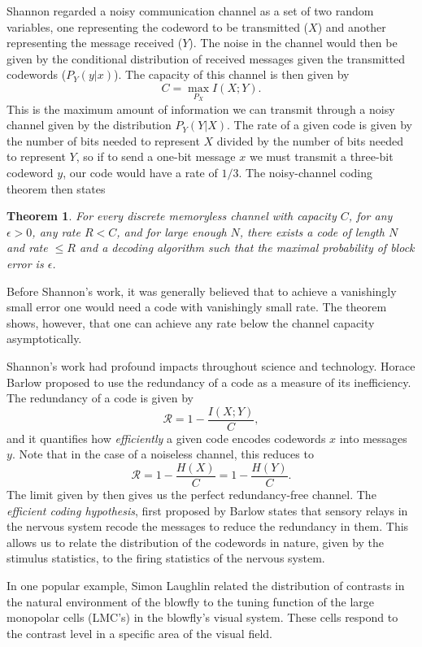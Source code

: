 Shannon regarded a noisy communication channel as a set of two random variables, one representing the codeword to be transmitted ($X$) and another representing the message received ($Y$). The noise in the channel would then be given by the conditional distribution of received messages given the transmitted codewords ($P_Y(y|x)$). The capacity of this channel is then given by
$$
C = \max_{P_X} I(X;Y).
$$
This is the maximum amount of information we can transmit through a noisy channel given by the distribution $P_Y(Y|X)$.
The rate of a given code is given by the number of bits needed to represent $X$ divided by the number of bits needed to represent $Y$, so if to send a one-bit message $x$ we must transmit a three-bit codeword $y$, our code would have a rate of $1/3$.
The noisy-channel coding theorem\cite{mackay2003information} then states
\newtheorem{noisychannel}{Theorem}
\begin{noisychannel}
\label{thm:noisychannel}
For every discrete memoryless channel with capacity $C$, for any $\epsilon>0$, any rate $R<C$, and for large enough $N$, there exists a code of length $N$ and rate $\leq R$ and a decoding algorithm such that the maximal probability of block error is $\epsilon$.
\end{noisychannel}
Before Shannon's work, it was generally believed that to achieve a vanishingly small error one would need a code with vanishingly small rate. The theorem shows, however, that one can achieve any rate below the channel capacity asymptotically.\par
Shannon's work had profound impacts throughout science and technology. Horace Barlow proposed to use the redundancy of a code as a measure of its inefficiency. The redundancy of a code is given by
$$
\mathcal{R} = 1 - \frac{I(X;Y)}{C},
$$
and it quantifies how {\em efficiently} a given code encodes codewords $x$ into messages $y$. Note that in the case of a noiseless channel, this reduces to 
$$
\mathcal{R} = 1 - \frac{H(X)}{C}= 1 - \frac{H(Y)}{C}.
$$
The limit given by  then gives us the perfect redundancy-free channel. The {\em efficient coding hypothesis}, first proposed by Barlow\cite{Barlow1961} states that sensory relays in the nervous system recode the	messages to reduce the redundancy in them. This allows us to relate the distribution of the codewords in nature, given by the stimulus statistics, to the firing statistics of the nervous system.\par
In one popular example, Simon Laughlin related the distribution of contrasts in the natural environment of the blowfly to the tuning function of the large monopolar cells (LMC's) in the blowfly's visual system.\cite{Laughlin1981} These cells respond to the contrast level in a specific area of the visual field.
